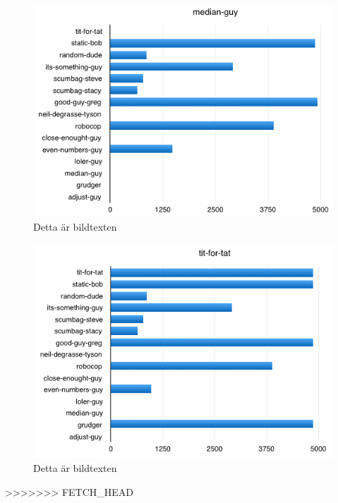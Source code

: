 \begin{figure}[htb]
	\begin{center}
	\includegraphics[scale=0.75, angle=0]{bilder/median-guy.png}
	\caption{Detta är bildtexten}
	\label{median-guy}
	\end{center}
\end{figure}

\begin{figure}[htb]
	\begin{center}
	\includegraphics[scale=0.75, angle=0]{bilder/tit-for-tat.png}
	\caption{Detta är bildtexten}
	\label{tit-for-tat}
	\end{center}
\end{figure}
>>>>>>> FETCH_HEAD
